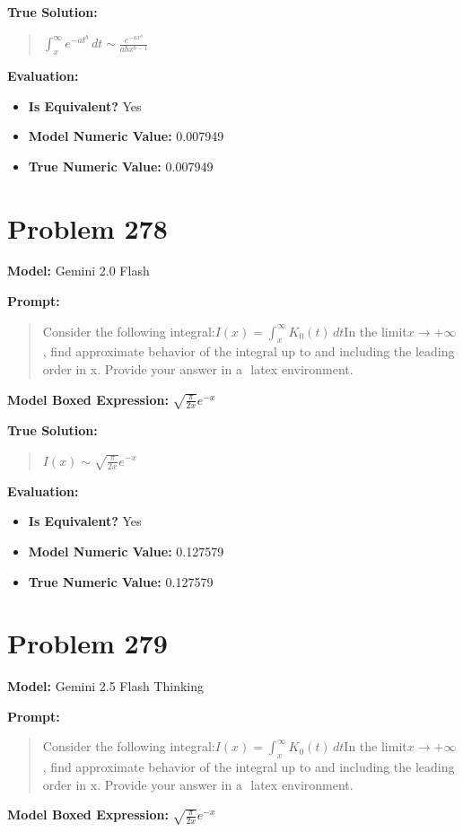 \documentclass{article}
\begin{document}
{\textbf{True Solution:}
\begin{quote}
$\int_{x}^{\infty} e^{-a t^b} \, dt \sim \frac{e^{-a x^b}}{a b x^{b-1}}$
\end{quote}

\textbf{Evaluation:}
\begin{itemize}
\item \textbf{Is Equivalent?} Yes
\item \textbf{Model Numeric Value:} 0.007949
\item \textbf{True Numeric Value:} 0.007949
\end{itemize}
\vspace{1cm}
\section*{Problem 278}
\textbf{Model:} Gemini 2.0 Flash

\textbf{Prompt:}
\begin{quote}
Consider the following integral:$ I(x) = \int_{x}^{\infty} K_0(t) \, dt $In the limit$x \to +\infty$, find approximate behavior of the integral up to and including the leading order in x. Provide your answer in a $\boxed{}$ latex environment.
\end{quote}
\textbf{Model Boxed Expression:} $\sqrt{\frac{\pi}{2x}}e^{-x}$

\textbf{True Solution:}
\begin{quote}
$I(x) \sim \sqrt{\frac{\pi}{2x}} e^{-x}$
\end{quote}

\textbf{Evaluation:}
\begin{itemize}
\item \textbf{Is Equivalent?} Yes
\item \textbf{Model Numeric Value:} 0.127579
\item \textbf{True Numeric Value:} 0.127579
\end{itemize}
\vspace{1cm}
\section*{Problem 279}
\textbf{Model:} Gemini 2.5 Flash Thinking

\textbf{Prompt:}
\begin{quote}
Consider the following integral:$ I(x) = \int_{x}^{\infty} K_0(t) \, dt $In the limit$x \to +\infty$, find approximate behavior of the integral up to and including the leading order in x. Provide your answer in a $\boxed{}$ latex environment.
\end{quote}
\textbf{Model Boxed Expression:} $\sqrt{\frac{\pi}{2x}}e^{-x}$

}
\end{document}
